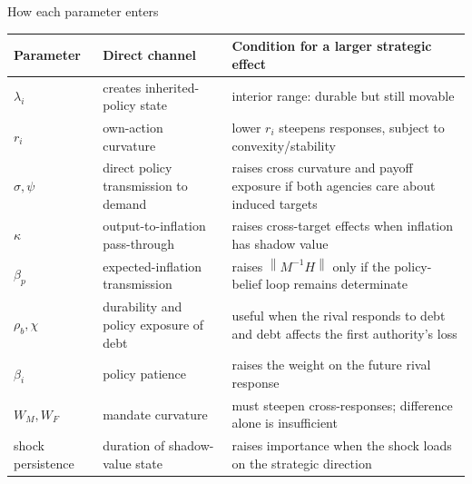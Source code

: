 \documentclass[10pt,aspectratio=169]{beamer}
\newcommand{\norm}[1]{\left\lVert#1\right\rVert}
\begin{document}
\begin{frame}{How each parameter enters}
\scriptsize
\begin{tabular}{@{}>{\raggedright\arraybackslash}p{}
                    >{\raggedright\arraybackslash}p{}
                    >{\raggedright\arraybackslash}p{}@{}}
\toprule
Parameter & Direct channel & Condition for a larger strategic effect \\
\midrule
$\lambda_i$ & creates inherited-policy state & interior range: durable but still movable \\
$r_i$ & own-action curvature & lower $r_i$ steepens responses, subject to convexity/stability \\
$\sigma,\psi$ & direct policy transmission to demand & raises cross curvature and payoff exposure if both agencies care about induced targets \\
$\kappa$ & output-to-inflation pass-through & raises cross-target effects when inflation has shadow value \\
$\beta_p$ & expected-inflation transmission & raises $\norm{M^{-1}H}$ only if the policy-belief loop remains determinate \\
$\rho_b,\chi$ & durability and policy exposure of debt & useful when the rival responds to debt and debt affects the first authority's loss \\
$\beta_i$ & policy patience & raises the weight on the future rival response \\
$W_M,W_F$ & mandate curvature & must steepen cross-responses; difference alone is insufficient \\
shock persistence & duration of shadow-value state & raises importance when the shock loads on the strategic direction \\
\bottomrule
\end{tabular}
\end{frame}
\end{document}
